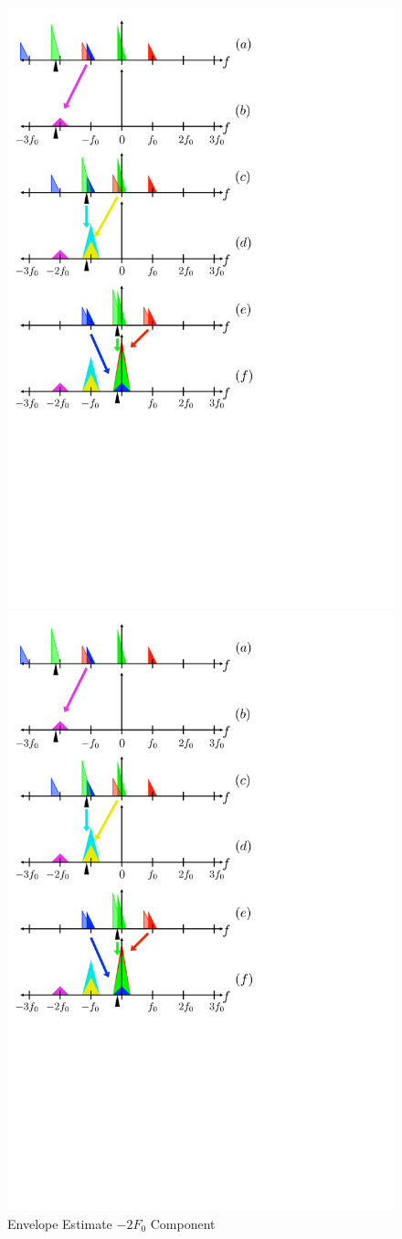 \documentclass [11pt, proquest] {uwthesis}[2015/03/03]
\begin{document}
\begin{figure}[!ht]
   \centering
    \includegraphics[width=.62\textwidth]{harmonic_envelope_2F0}   
    \caption{Envelope Estimate $-2F_0$ Component}\label{fig:harmonic_envelope_2F0}
    \includegraphics[width=.62\textwidth]{harmonic_envelope_F0} 

\end{figure}
\end{document}
